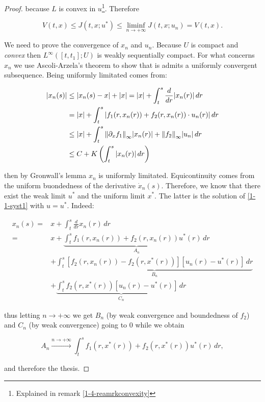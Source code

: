 \begin{theorem}
\begin{proof}
        because $L$ is convex in $u$\footnote{Explained in remark \ref{1-4-reamrkconvexity}}. Therefore

        \[V(t,x)\leq J(t,x;u^{\ast}) \leq \liminf_{n\to+\infty} J(t,x;u_n) = V(t,x).\]

        We need to prove the convergence of $x_n$ and $u_n$. {\color{red}{} Because $U$ is compact and \textit{convex} then $L^{\infty}([t,t_1];U)$ is 
        weakly sequentially compact}. For what concerns $x_n$ we use Ascoli-Arzela's theorem to show that is admits a uniformly convergent subsequence. Being 
        uniformly limitated comes from:

        \begin{align*}
            \abs{x_n(s)} & \leq \abs{x_n(s)-x}+\abs{x} = \abs{x} + \int_t^s \frac{d}{dr}\abs{x_n(r)} \,dr \\
            & = \abs{x} + \int_t^s \abs{f_1(r,x_n(r)) + f_2(r,x_n(r))\cdot u_n(r)}\,dr \\
            & \leq \abs{x} + \int_t^s \norm{\partial_xf_1}_{\infty}\abs{x_n(r)} + \norm{f_2}_{\infty}\abs{u_n} \,dr \\
            & \leq C + K\left( \int_t^s \abs{x_n(r)} \,dr \right)   
        \end{align*}

        then by Gronwall's lemma $x_n$ is uniformly limitated. Equicontinuity comes from the uniform buondedness of the
        derivative $\dot{x}_n(s)$. Therefore, we know that there exist the weak limit $u^{\ast}$ and the uniform
        limit $x^{\ast}$. The latter is the solution of \eqref{1-1-syst1} with $u=u^{\ast}$. Indeed:

        \begin{align*}
                x_n(s) = & x + \int_t^s\frac{d}{dr}x_n(r) \,dr\\
                = & x + \underbrace{\int_t^sf_1(r,x_n(r)) + f_2(r,x_n(r))u^{\ast}(r) \,dr}_{A_n} \\ 
                & + \underbrace{\int_t^s \left[f_2(r,x_n(r)) - f_2(r,x^{\ast}(r))\right]\left[u_n(r)-u^{\ast}(r)\right] \,dr}_{B_n} \\
                & + \underbrace{\int_t^s f_2(r,x^{\ast}(r))\left[u_n(r)-u^{\ast}(r)\right] \,dr}_{C_n}
        \end{align*}
        
        thus letting $n\to+\infty$ we get $B_n$ (by weak convergence and boundedness of $f_2$) and $C_n$ (by weak convergence) going to $0$ 
        while we obtain

        \[A_n\xrightarrow{n\to+\infty}\int_t^sf_1(r,x^{\ast}(r))+f_2(r,x^{\ast}(r))u^{\ast}(r)\,dr,\]
        
        and therefore the thesis.
    \end{proof}
\end{theorem}


